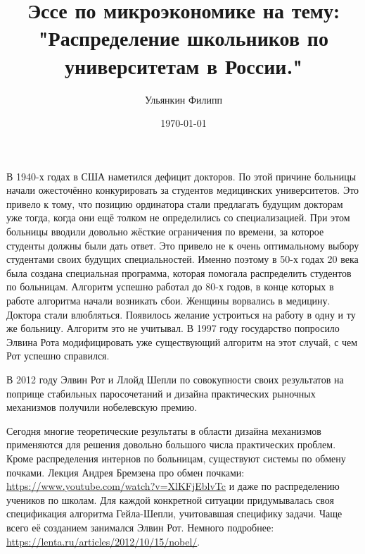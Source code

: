 \documentclass[pdftex, 11pt, a4paper]{article}
\title{Эссе по микроэкономике на тему: \\ "Распределение школьников по университетам в России."}
\author{Ульянкин Филипп}
\date{\today}
\begin{document}
\maketitle





В 1940-х годах в США наметился дефицит докторов. По этой причине больницы начали ожесточённо конкурировать за студентов медицинских университетов. Это привело к тому, что позицию ординатора стали предлагать будущим докторам уже тогда, когда они ещё толком не определились со специализацией. При этом больницы вводили довольно жёсткие ограничения по времени, за которое студенты должны были дать ответ. Это привело не к очень оптимальному выбору студентами своих будущих специальностей. Именно поэтому в 50-х годах 20 века была создана специальная программа, которая помогала распределить студентов по больницам. Алгоритм успешно работал до 80-х годов, в конце которых в работе алгоритма начали возникать сбои. Женщины ворвались в медицину. Доктора стали влюбляться. Появилось желание устроиться на работу в одну и ту же больницу. Алгоритм это не учитывал. В 1997 году государство попросило Элвина Рота модифицировать уже существующий алгоритм на этот случай, с чем Рот успешно справился.  

В 2012 году Элвин Рот и Ллойд Шепли по совокупности своих результатов на поприще стабильных паросочетаний и дизайна практических рыночных механизмов получили нобелевскую премию. 


Сегодня многие теоретические результаты в области дизайна механизмов применяются для решения довольно большого числа практических проблем. Кроме распределения интернов по больницам, существуют системы по обмену почками. Лекция Андрея Бремзена про обмен почками: \url{https://www.youtube.com/watch?v=XlKFjEblvTc} и даже по распределению учеников по школам. Для каждой конкретной ситуации придумывалась своя спецификация алгоритма Гейла-Шепли, учитовавшая специфику задачи. Чаще всего её созданием занимался Элвин Рот. Немного подробнее: \url{https://lenta.ru/articles/2012/10/15/nobel/}. 
\end{document}
